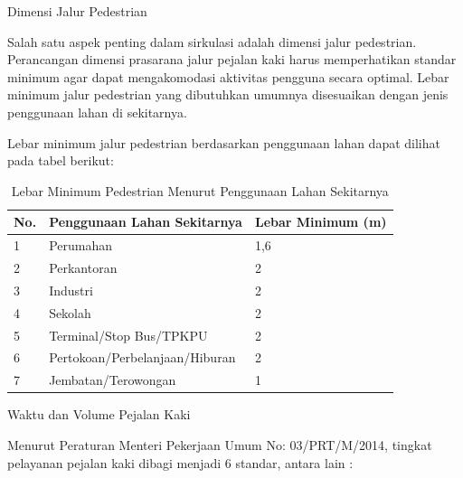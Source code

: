\documentclass[../rumukota.tex]{subfiles}
\begin{document}
\tabitem Dimensi Jalur Pedestrian

Salah satu aspek penting dalam sirkulasi adalah dimensi jalur pedestrian. Perancangan dimensi prasarana jalur pejalan kaki harus memperhatikan standar minimum agar dapat mengakomodasi aktivitas pengguna secara optimal. Lebar minimum jalur pedestrian yang dibutuhkan umumnya disesuaikan dengan jenis penggunaan lahan di sekitarnya.

Lebar minimum jalur pedestrian berdasarkan penggunaan lahan dapat dilihat pada tabel berikut:



\begin{table}[h]
	\centering
	\begin{tabularx}{\textwidth}{p{20mm}lX}
		\hline
		No.  &  Penggunaan Lahan Sekitarnya     &  Lebar Minimum (m)  \\ \hline
		1    &  Perumahan                       &  1,6  \\
		2    &  Perkantoran                     &  2  \\
		3    &  Industri                        &  2  \\
		4    &  Sekolah                         &  2  \\
		5    &  Terminal/Stop Bus/TPKPU         &  2  \\
		6    &  Pertokoan/Perbelanjaan/Hiburan  &  2  \\
		7    &  Jembatan/Terowongan             &  1  \\
	\end{tabularx}
	\caption{Lebar Minimum Pedestrian Menurut Penggunaan Lahan Sekitarnya}
\end{table}


\tabitem Waktu dan Volume Pejalan Kaki

Menurut Peraturan Menteri Pekerjaan Umum No: 03/PRT/M/2014, tingkat pelayanan pejalan kaki dibagi menjadi 6 standar, antara lain :
\end{document}
